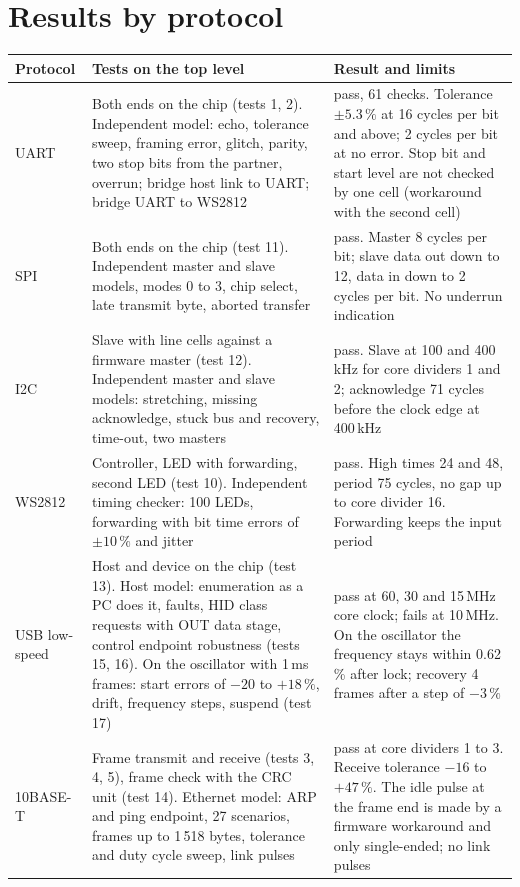 \documentclass[10pt,a4paper]{article}
\begin{document}
\section{Results by protocol}

\begin{table}[H]
\centering\small
\begin{tabularx}{\linewidth}{@{}lLL@{}}
\toprule
Protocol & Tests on the top level & Result and limits \\
\midrule
UART & Both ends on the chip (tests 1, 2). Independent model: echo, tolerance sweep, framing error, glitch, parity, two stop bits from the partner, overrun; bridge host link to UART; bridge UART to WS2812 & pass, 61 checks. Tolerance $\pm 5.3\,\%$ at 16 cycles per bit and above; 2 cycles per bit at no error. Stop bit and start level are not checked by one cell (workaround with the second cell) \\
SPI & Both ends on the chip (test 11). Independent master and slave models, modes 0 to 3, chip select, late transmit byte, aborted transfer & pass. Master 8 cycles per bit; slave data out down to 12, data in down to 2 cycles per bit. No underrun indication \\
I2C & Slave with line cells against a firmware master (test 12). Independent master and slave models: stretching, missing acknowledge, stuck bus and recovery, time-out, two masters & pass. Slave at 100 and 400\,kHz for core dividers 1 and 2; acknowledge 71 cycles before the clock edge at 400\,kHz \\
WS2812 & Controller, LED with forwarding, second LED (test 10). Independent timing checker: 100 LEDs, forwarding with bit time errors of $\pm 10\,\%$ and jitter & pass. High times 24 and 48, period 75 cycles, no gap up to core divider 16. Forwarding keeps the input period \\
USB low-speed & Host and device on the chip (test 13). Host model: enumeration as a PC does it, faults, HID class requests with OUT data stage, control endpoint robustness (tests 15, 16). On the oscillator with 1\,ms frames: start errors of $-20$ to $+18\,\%$, drift, frequency steps, suspend (test 17) & pass at 60, 30 and 15\,MHz core clock; fails at 10\,MHz. On the oscillator the frequency stays within 0.62\,\% after lock; recovery 4 frames after a step of $-3\,\%$ \\
10BASE-T & Frame transmit and receive (tests 3, 4, 5), frame check with the CRC unit (test 14). Ethernet model: ARP and ping endpoint, 27 scenarios, frames up to 1\,518 bytes, tolerance and duty cycle sweep, link pulses & pass at core dividers 1 to 3. Receive tolerance $-16$ to $+47\,\%$. The idle pulse at the frame end is made by a firmware workaround and only single-ended; no link pulses \\

\end{tabularx}
\end{table}
\end{document}
